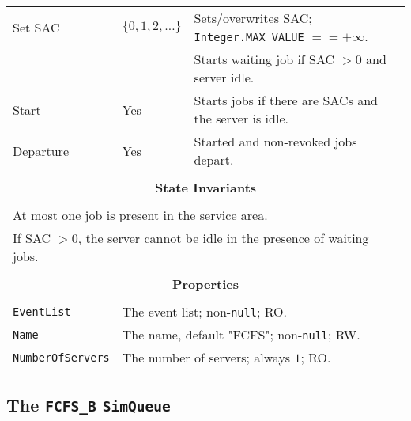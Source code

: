 \documentclass[12pt]{book}
\begin{document}
\begin{tabular}{|l|l|l|}
\hline
Set SAC & $\{0, 1, 2, \ldots\}$ & Sets/overwrites SAC; \lstinline|Integer.MAX_VALUE| $== +\infty$. \\
        &                       & Starts waiting job if SAC $> 0$ and server idle. \\
\hline
Start & Yes & Starts jobs if there are SACs and the server is idle. \\
\hline
Departure & Yes & Started and non-revoked jobs depart. \\
\hline
\multicolumn{3}{|c|}{} \\
\multicolumn{3}{|c|}{\bf State  Invariants} \\
\multicolumn{3}{|c|}{} \\
\hline
\multicolumn{3}{|l|}{At most one job is present in the service area.} \\
\multicolumn{3}{|l|}{If SAC $> 0$, the server cannot be idle in the presence of waiting jobs.} \\
\hline
\multicolumn{3}{|c|}{} \\
\multicolumn{3}{|c|}{\bf Properties} \\
\multicolumn{3}{|c|}{} \\
\hline
\lstinline|EventList|       & \multicolumn{2}{|l|}{The event list; non-\lstinline|null|; RO.} \\
\hline
\lstinline|Name|            & \multicolumn{2}{|l|}{The name, default "FCFS"; non-\lstinline|null|; RW.} \\
\hline
\lstinline|NumberOfServers| & \multicolumn{2}{|l|}{The number of servers; always $1$; RO.} \\
\hline
\end{tabular}

\subsection{The \lstinline{FCFS_B} \lstinline{SimQueue}}
\end{document}
